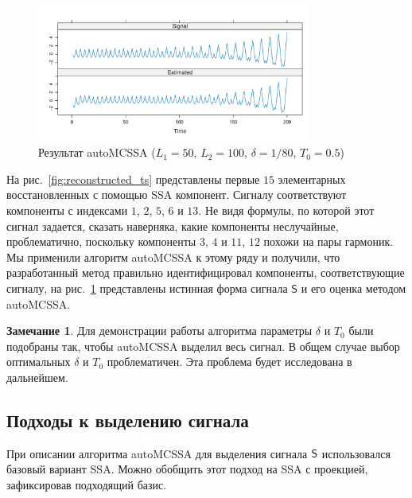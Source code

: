 \documentclass[specialist,
substylefile = spbu_report.rtx,
subf,href,colorlinks=true, 12pt]{disser}
\theoremstyle{definition}
\newtheorem{remark}{Замечание}[chapter]
\begin{document}
\begin{figure}[!h]
	\centering
	\includegraphics[width=0.8\textwidth]{img/auto_mcssa_result.pdf}
	\caption{Результат autoMCSSA ($L_1=50$, $L_2=100$, $\delta=1/80$, $T_0=0.5$)}
	\label{fig:autoMCSSA_res}
\end{figure}

На рис.~\ref{fig:reconstructed_ts} представлены первые $15$ элементарных восстановленных с помощью SSA компонент. Сигналу соответствуют компоненты с индексами $1$, $2$, $5$, $6$ и $13$. Не видя формулы, по которой этот сигнал задается, сказать наверняка, какие компоненты неслучайные, проблематично, поскольку компоненты $3$, $4$ и $11$, $12$ похожи на пары гармоник. Мы применили алгоритм autoMCSSA к этому ряду и получили, что разработанный метод правильно идентифицировал компоненты, соответствующие сигналу, на рис.~\ref{fig:autoMCSSA_res} представлены истинная форма сигнала $\mathsf{S}$ и его оценка методом autoMCSSA.

\begin{remark}
	Для демонстрации работы алгоритма параметры $\delta$ и $T_0$ были подобраны так, чтобы autoMCSSA выделил весь сигнал. В общем случае выбор оптимальных $\delta$ и $T_0$ проблематичен. Эта проблема будет исследована в дальнейшем.
\end{remark}

\subsection{Подходы к выделению сигнала}

При описании алгоритма autoMCSSA для выделения сигнала $\mathsf{S}$ использовался базовый вариант SSA. Можно обобщить этот подход на SSA с проекцией, зафиксировав подходящий базис.
\end{document}
